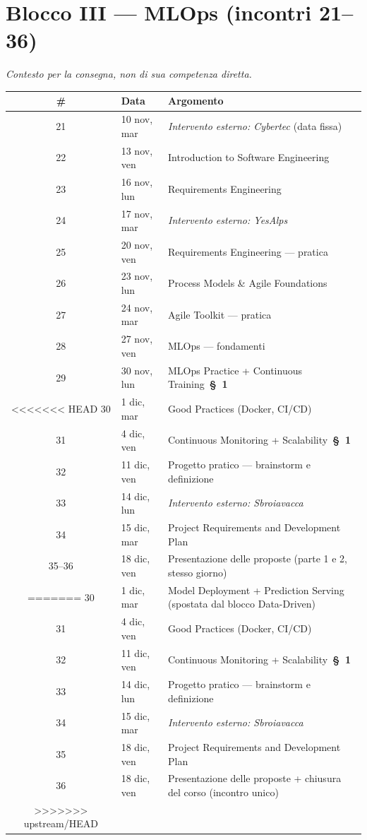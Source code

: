\documentclass[11pt,a4paper]{article}
\newcommand{\flag}[1]{{\small\color{coursegold}\bfseries \S\ #1}}
\begin{document}
\section{Blocco III --- MLOps (incontri 21--36)}
\textit{Contesto per la consegna, non di sua competenza diretta.}

\begin{center}
\begin{tabularx}{\textwidth}{@{}c l X@{}}
\toprule
\textbf{\#} & \textbf{Data} & \textbf{Argomento} \\
\midrule
21 & 10 nov, mar & \textit{Intervento esterno: Cybertec} (data fissa) \\
22 & 13 nov, ven & Introduction to Software Engineering \\
23 & 16 nov, lun & Requirements Engineering \\
24 & 17 nov, mar & \textit{Intervento esterno: YesAlps} \\
25 & 20 nov, ven & Requirements Engineering --- pratica \\
26 & 23 nov, lun & Process Models \& Agile Foundations \\
27 & 24 nov, mar & Agile Toolkit --- pratica \\
28 & 27 nov, ven & MLOps --- fondamenti \\
29 & 30 nov, lun & MLOps Practice + Continuous Training~\flag{1} \\
<<<<<<< HEAD
30 & 1 dic, mar & Good Practices (Docker, CI/CD) \\
31 & 4 dic, ven & Continuous Monitoring + Scalability~\flag{1} \\
32 & 11 dic, ven & Progetto pratico --- brainstorm e definizione \\
33 & 14 dic, lun & \textit{Intervento esterno: Sbroiavacca} \\
34 & 15 dic, mar & Project Requirements and Development Plan \\
35--36 & 18 dic, ven & Presentazione delle proposte (parte 1 e 2, stesso giorno) \\
=======
30 & 1 dic, mar & Model Deployment + Prediction Serving (spostata dal blocco Data-Driven) \\
31 & 4 dic, ven & Good Practices (Docker, CI/CD) \\
32 & 11 dic, ven & Continuous Monitoring + Scalability~\flag{1} \\
33 & 14 dic, lun & Progetto pratico --- brainstorm e definizione \\
34 & 15 dic, mar & \textit{Intervento esterno: Sbroiavacca} \\
35 & 18 dic, ven & Project Requirements and Development Plan \\
36 & 18 dic, ven & Presentazione delle proposte + chiusura del corso (incontro unico) \\
>>>>>>> upstream/HEAD
\bottomrule
\end{tabularx}
\end{center}
\end{document}
